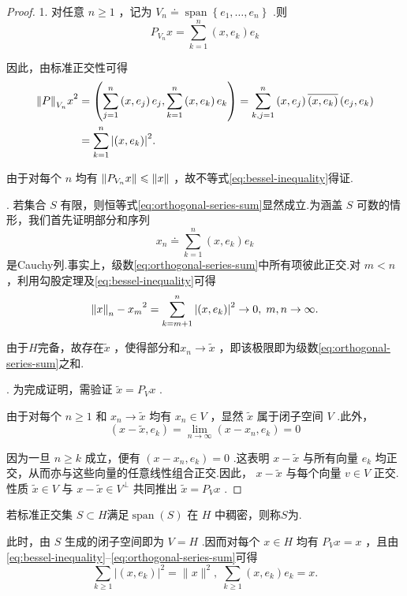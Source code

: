 \begin{proof}
1. 对任意 $n \geq  1$ ，记为 ${V}_{n} \doteq  \operatorname{span}\left\{  {{e}_{1},\ldots ,{e}_{n}}\right\}$ .则
\[
{P}_{{V}_{n}}x = \sum\limits_{{k = 1}}^{n}\left( {x,{e}_{k}}\right) {e}_{k}
\]

因此，由标准正交性可得
{\begin{align*}
    {\norm{P}_{{V}_{n}}x}^{2}& = \left( {\sum\limits_{{j = 1}}^{n}\left( {x,{e}_{j}}\right) {e}_{j},\sum\limits_{{k = 1}}^{n}\left( {x,{e}_{k}}\right) {e}_{k}}\right)  = \sum\limits_{{k,j = 1}}^{n}\left( {x,{e}_{j}}\right) \overline{\left( x,{e}_{k}\right) }\left( {{e}_{j},{e}_{k}}\right)\\
    &= \sum\limits_{{k = 1}}^{n}{\left| \left( x,{e}_{k}\right) \right| }^{2}.
\end{align*}}

由于对每个 $n$ 均有 $\norm{{P}_{{V}_{n}}x} \leqslant  \| x\|$ ，故不等式\eqref{eq:bessel-inequality}得证.

. 若集合 $S$ 有限，则恒等式\eqref{eq:orthogonal-series-sum}显然成立.为涵盖 $S$ 可数的情形，我们首先证明部分和序列
\[
{x}_{n} \doteq  \sum\limits_{{k = 1}}^{n}\left( {x,{e}_{k}}\right) {e}_{k}
\]
是Cauchy列.事实上，级数\eqref{eq:orthogonal-series-sum}中所有项彼此正交.对 $m < n$ ，利用勾股定理及\eqref{eq:bessel-inequality}可得
\[
{\norm{x}_{n} - {x}_{m}}^{2} = \sum\limits_{{k = m + 1}}^{n}{\left| \left( x,{e}_{k}\right) \right| }^{2} \rightarrow  0,\;m,n \rightarrow  \infty .
\]

由于$H$完备，故存在$\widetilde{x}$ ，使得部分和${x}_{n} \rightarrow  \widetilde{x}$ ，即该极限即为级数\eqref{eq:orthogonal-series-sum}之和.

. 为完成证明，需验证 $\widetilde{x} = {P}_{V}x$ .

由于对每个 $n \geq  1$ 和 ${x}_{n} \rightarrow  \widetilde{x}$ 均有 ${x}_{n} \in  V$ ，显然 $\widetilde{x}$ 属于闭子空间 $V$ .此外，
\[
\left( {x - \widetilde{x},{e}_{k}}\right)  = \mathop{\lim }\limits_{{n \rightarrow  \infty }}\left( {x - {x}_{n},{e}_{k}}\right)  = 0
\]

因为一旦 $n \geq  k$ 成立，便有 $\left( {x - {x}_{n},{e}_{k}}\right)  = 0$ .这表明 $x - \widetilde{x}$ 与所有向量 ${e}_{k}$ 均正交，从而亦与这些向量的任意线性组合正交.因此， $x - \widetilde{x}$ 与每个向量 $v \in  V$ 正交.性质 $\widetilde{x} \in  V$ 与 $x - \widetilde{x} \in  {V}^{ \bot  }$ 共同推出 $\widetilde{x} = {P}_{V}x$ .
\end{proof}

\begin{definition}[标准正交基]
    若标准正交集 $S\subset  H$满足$\operatorname{span}\left( S\right)$ 在 $H$ 中稠密，则称$S$为.
\end{definition}
此时，由 $S$ 生成的闭子空间即为 $V = H$ .因而对每个 $x \in  H$ 均有 ${P}_{V}x = x$ ，且由\eqref{eq:bessel-inequality}--\eqref{eq:orthogonal-series-sum}可得
\begin{equation}\tag{5.12}\label{eq:parseval-identity}
\sum\limits_{{k \geq  1}}{\left| \left( x,{e}_{k}\right) \right| }^{2} = \| x{\| }^{2},\;\sum\limits_{{k \geq  1}}\left( {x,{e}_{k}}\right) {e}_{k} = x.
\end{equation}

